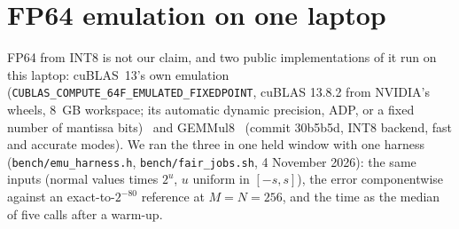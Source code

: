 \documentclass[11pt]{article}
\begin{document}
\section{FP64 emulation on one laptop}\label{sec:emu}
FP64 from INT8 is not our claim, and two public implementations of it run on this laptop: cuBLAS~13's own emulation
(\texttt{CUBLAS\_COMPUTE\_64F\_EMULATED\_FIXEDPOINT}, cuBLAS 13.8.2 from NVIDIA's wheels, 8~GB workspace; its automatic dynamic
precision, ADP, or a fixed number of mantissa bits)~\cite{nvemu,cublasdoc} and GEMMul8~\cite{gemmul8} (commit 30b5b5d, INT8
backend, fast and accurate modes). We ran the three in one held window with one harness (\texttt{bench/emu\_harness.h},
\texttt{bench/fair\_jobs.sh}, 4 November 2026): the same inputs (normal values times $2^{u}$, $u$ uniform in $[-s,s]$), the error
componentwise against an exact-to-$2^{-80}$ reference at $M=N=256$, and the time as the median of five calls after a warm-up.
\end{document}
